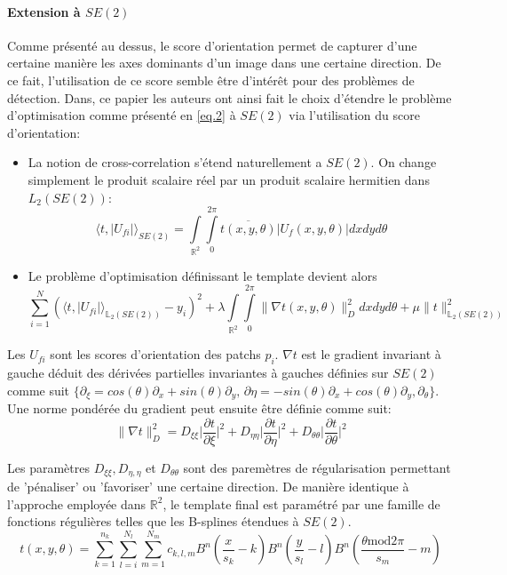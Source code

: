 \documentclass{article}
\begin{document}
\paragraph{Extension à $SE(2)$}
Comme présenté au dessus, le score d'orientation permet de capturer d'une certaine manière les axes dominants d'un image dans une certaine direction. De ce fait, 
l'utilisation de ce score semble être d'intérêt pour des problèmes de détection.
Dans, ce papier les auteurs ont ainsi fait le choix d'étendre le problème d'optimisation comme présenté en \ref{eq.2} à $SE(2)$ via 
l'utilisation du score d'orientation: 
\begin{itemize}
  \item La notion de cross-correlation s'étend naturellement a $ SE(2) $. On change
    simplement le produit scalaire réel par un produit scalaire hermitien dans $
    L_2(SE(2)) $:
    \[
        \langle t, |U_{fi}| \rangle_{SE(2)} = 
        \int \limits_{\mathbb{R}^2} \int \limits_{0}^{2\pi} \overline{t(x, y, \theta)} \lvert U_f (x, y, \theta) \rvert dxdyd\theta
    \]
  \item Le problème d'optimisation définissant le template devient alors \[ \sum
      \limits_{i=1}^N (\langle t, |U_{fi}| \rangle_{{\mathbb{L}_2(SE(2))}} - y_i)^2 +
      \lambda \int \limits_{\mathbb{R}^2} \int \limits_{0}^{2\pi} \lVert \nabla t(x, y,
      \theta)\rVert_{D}^2 dxdyd\theta + \mu \lVert t \rVert_{\mathbb{L}_2(SE(2))}^2 \]
\end{itemize}
Les $U_{fi}$ sont les scores d'orientation des patchs $p_i$.  $\nabla t$ est le gradient
invariant à gauche déduit des dérivées partielles invariantes à gauches définies sur
$SE(2)$ comme suit $\{\partial_{\xi} = cos(\theta)\partial_x + sin(\theta) \partial_y,\,
\partial{\eta} = -sin(\theta) \partial_x + cos(\theta) \partial_y, \partial_{\theta}\}$.
Une norme pondérée du gradient peut ensuite être définie comme suit:
\[
    \lVert \nabla t \rVert_{D}^2 = D_{\xi \xi} \Big|\frac{\partial t}{\partial \xi} \Big|^2
    + D_{\eta \eta} \Big|\frac{\partial t}{\partial \eta}\Big|^2 + D_{\theta \theta} \Big|\frac{\partial t}{\partial \theta}\Big|^2
\]


Les paramètres $D_{\xi \xi}, D_{\eta, \eta}$ et $D_{\theta \theta}$ sont des paremètres de régularisation permettant de 'pénaliser' ou 'favoriser' une certaine direction.
De manière identique à l'approche employée dans $\mathbb{R}^2$, le template final est paramétré par une famille de fonctions
régulières telles que les B-splines étendues à $SE(2)$.
\[
    t(x, y, \theta) = \sum \limits_{k=1}^{n_k} \sum \limits_{l=i}^{N_l} \sum \limits_{m=1}^{N_m} c_{k,l,m} B^n \left (\frac{x}{s_k} - k \right )
    B^n \left (\frac{y}{s_l} - l \right) B^n \left (\frac{\theta \text{mod} 2\pi}{s_m} - m \right )
\]
\end{document}
